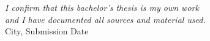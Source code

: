 \thispagestyle{empty}

\vspace*{\fill}
\begin{flushright}
\noindent \textit{I confirm that this bachelor's thesis is my own work \\ and I have documented all sources and material used.\\[\baselineskip]}
City, Submission Date \\[3.5\baselineskip]
\underline{\hspace{6.5cm}}
\end{flushright}
